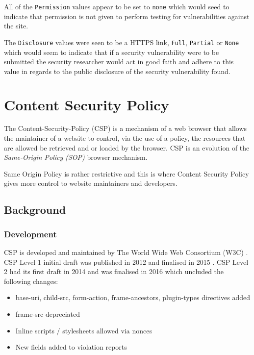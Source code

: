 \documentclass{mscreport}
\begin{document}
\noindent
All of the \texttt{Permission} values appear to be set to \texttt{none} which would seed to indicate that permission is not given to perform testing for vulnerabilities against the site.

\vspace{0.3cm} \noindent
The \texttt{Disclosure} values were seen to be a HTTPS link, \texttt{Full}, \texttt{Partial} or \texttt{None} which would seem to indicate that if a security vulnerability were to be submitted the security researcher would act in good faith and adhere to this value in regards to the public disclosure of the security vulnerability found.

\newpage

\section{Content Security Policy}
\label{section:csp}

The Content-Security-Policy (CSP) is a mechanism of a web browser that allows the maintainer of a website to control, via the use of a policy, the resources that are allowed be retrieved and or loaded by the browser. CSP is an evolution of the \textit{Same-Origin Policy (SOP)} browser mechanism.

\vspace{0.3cm} \noindent
Same Origin Policy is rather restrictive and this is where Content Security Policy gives more control to website maintainers and developers.

\subsection{Background}
\subsubsection{Development}

CSP is developed and maintained by The World Wide Web Consortium (W3C) \cite{Barth2012-ow}.
CSP Level 1 initial draft was published in 2012 \cite{Barth2012-ow} and finalised in 2015 \cite{Barth2015-ez}.
CSP Level 2 had its first draft in 2014 \cite{West2014-oe} and was finalised in 2016 \cite{West2016-ol} which uncluded the following changes:
\begin{itemize}
	\setlength\itemsep{0.1em}
	\item base-uri, child-src, form-action, frame-ancestors, plugin-types directives added
	\item frame-src depreciated
	\item Inline scripts / stylesheets allowed via nonces
	\item New fields added to violation reports
\end{itemize}
\end{document}
